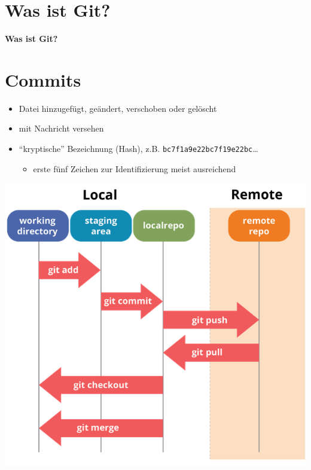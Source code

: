 \documentclass[
    ngerman,
    accentcolor=TUDa-1c,
    fontsize= 12pt,
    a4paper,
    aspectratio=169,
    colorback=true,
    fancy_row_colors,
    leqno,
    fleqn,
    boxarc=3pt,
    fleqn,
    ]{algoslides}
\begin{document}
\section{Was ist Git?}
\begin{frame}[c]
    \centering
    \Large
    \textbf{Was ist Git?}
\end{frame}

\section{Commits}

\begin{frame}
    \slidehead
    \begin{itemize}
        \item Datei hinzugefügt, geändert, verschoben oder gelöscht
        \item mit Nachricht versehen
        \item \enquote{kryptische} Bezeichnung (Hash), z.B. \texttt{bc7f1a9e22bc7f19e22bc}\dots
        \begin{itemize}
            \item erste fünf Zeichen zur Identifizierung meist ausreichend
        \end{itemize}
    \end{itemize}
\end{frame}

\begin{frame}
    \slidehead
    \vspace{-1em}
    \centering
    \includegraphics[scale=.3]{../pictures/structure-overview.png}
\end{frame}
\end{document}
